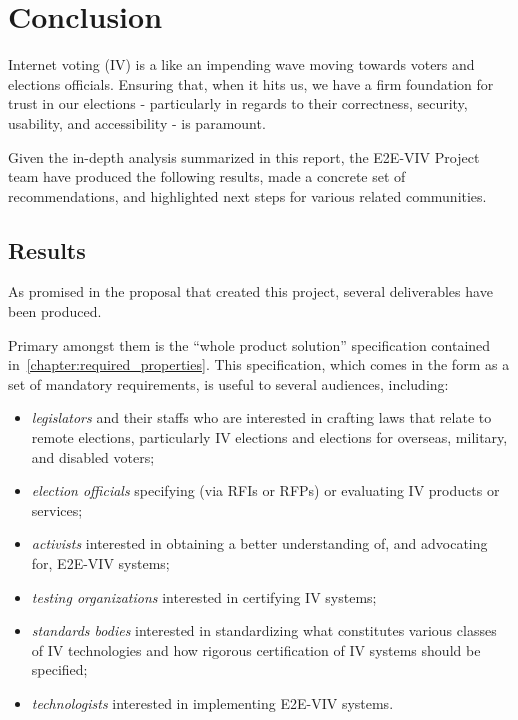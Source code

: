 \chapter{Conclusion}
\label{chapter:conclusion}

Internet voting (IV) is a like an impending wave moving towards voters and elections
officials.  Ensuring that, when it hits us, we have a firm foundation
for trust in our elections - particularly in regards to their
correctness, security, usability, and accessibility - is paramount.

Given the in-depth analysis summarized in this report, the E2E-VIV
Project team have produced the following
results, made a concrete set of recommendations, and highlighted next
steps for various related communities.

\section{Results}

As promised in the proposal that created this project,
several deliverables have been produced.  

Primary amongst them is the ``whole product solution'' specification
contained in~\autoref{chapter:required_properties}. This
specification, which comes in the form as a set of mandatory
requirements, is useful to several audiences, including:
\begin{itemize}
\item \emph{legislators} and their staffs who are interested in
  crafting laws that relate to remote elections, particularly IV
  elections and elections for overseas, military, and disabled voters;
\item \emph{election officials} specifying (via RFIs or RFPs) or
  evaluating IV products or services;
\item \emph{activists} interested in obtaining a better understanding
  of, and advocating for, E2E-VIV systems;
\item \emph{testing organizations} interested in certifying IV
  systems;
\item \emph{standards bodies} interested in standardizing what
  constitutes various classes of IV technologies and how rigorous
  certification of IV systems should be specified;
\item \emph{technologists} interested in implementing E2E-VIV systems.
\end{itemize}

